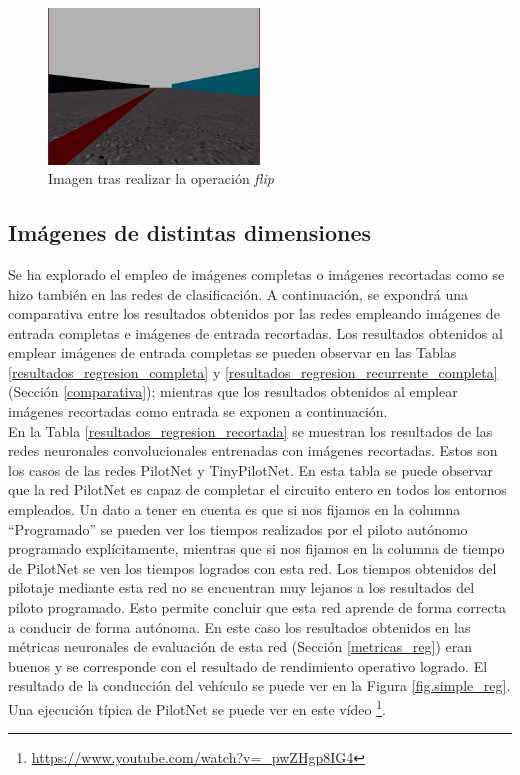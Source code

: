 \begin{figure}
\begin{center}
	\includegraphics[width=0.5\textwidth]{figures/Regresion/img_flip.png}
   \caption{Imagen tras realizar la operación \textit{flip}}
	\label{fig.image_flip}
\end{center}
\end{figure}



\subsection{Imágenes de distintas dimensiones}

Se ha explorado el empleo de imágenes completas o imágenes recortadas como se hizo también en las redes de clasificación. A continuación, se expondrá una comparativa entre los resultados obtenidos por las redes empleando imágenes de entrada completas e imágenes de entrada recortadas. Los resultados obtenidos al emplear imágenes de entrada completas se pueden observar en las Tablas \ref{resultados_regresion_completa} y 
\ref{resultados_regresion_recurrente_completa} (Sección \ref{comparativa}); mientras que los resultados obtenidos al emplear imágenes recortadas como entrada se exponen a continuación.\\

En la Tabla \ref{resultados_regresion_recortada} se muestran los resultados de las redes neuronales convolucionales entrenadas con imágenes recortadas. Estos son los casos de las redes PilotNet y TinyPilotNet. En esta tabla se puede observar que la red PilotNet es capaz de completar el circuito entero en todos los entornos empleados. Un dato a tener en cuenta es que si nos fijamos en la columna ``Programado'' se pueden ver los tiempos realizados por el piloto autónomo programado explícitamente, mientras que si nos fijamos en la columna de tiempo de PilotNet se ven los tiempos logrados con esta red. Los tiempos obtenidos del pilotaje mediante esta red no se encuentran muy lejanos a los resultados del piloto programado. Esto permite concluir que esta red aprende de forma correcta a conducir de forma autónoma. En este caso los resultados obtenidos en las métricas neuronales de evaluación de esta red (Sección \ref{metricas_reg}) eran buenos y se corresponde con el resultado de rendimiento operativo logrado. El resultado de la conducción del vehículo se puede ver en la Figura \ref{fig.simple_reg}. Una ejecución típica de PilotNet se puede ver en este vídeo  \footnote{\url{https://www.youtube.com/watch?v=_pwZHgp8IG4}}.

